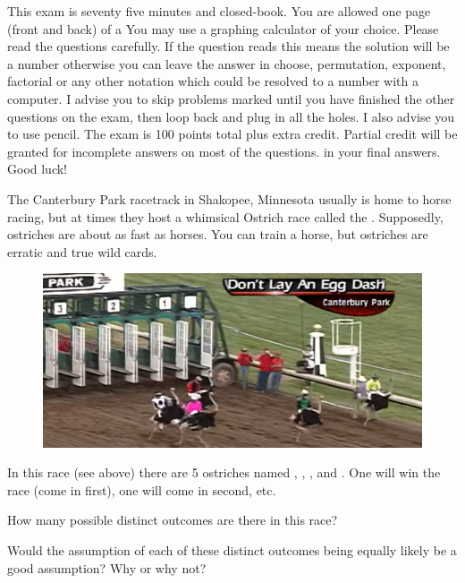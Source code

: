 \documentclass[12pt]{article}
\begin{document}
This exam is seventy five minutes and closed-book. You are allowed one page (front and back) of a  You may use a graphing calculator of your choice. Please read the questions carefully. If the question reads  this means the solution will be a number otherwise you can leave the answer in choose, permutation, exponent, factorial or any other notation which could be resolved to a number with a computer. I advise you to skip problems marked  until you have finished the other questions on the exam, then loop back and plug in all the holes. I also advise you to use pencil. The exam is 100 points total plus extra credit. Partial credit will be granted for incomplete answers on most of the questions.  in your final answers. Good luck!

\pagebreak

\problem The Canterbury Park racetrack in Shakopee, Minnesota usually is home to horse racing, but at times they host a whimsical Ostrich race called the .  Supposedly, ostriches are about as fast as horses. You can train a horse, but ostriches are erratic and true wild cards.

\begin{figure}[htp]
\centering
\includegraphics[width=6in]{dontlayanegg.png}
\end{figure}

In this race (see above) there are 5 ostriches named , , ,  and . One will win the race (come in first), one will come in second, etc.

\benum
{} How many possible distinct outcomes are there in this race? 

 Would the assumption of each of these distinct outcomes being equally likely be a good assumption? Why or why not? 
\end{document}
